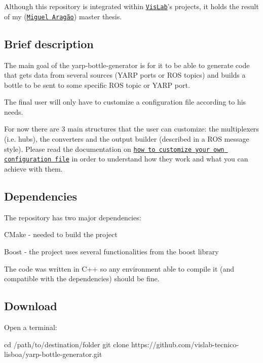 Although this repository is integrated within \href{https://github.com/vislab-tecnico-lisboa}{\tt Vis\-Lab}'s projects, it holds the result of my (\href{https://github.com/mikearagao}{\tt Miguel Aragão}) master thesis.

\subsection*{Brief description}

The main goal of the yarp-\/bottle-\/generator is for it to be able to generate code that gets data from several sources (Y\-A\-R\-P ports or R\-O\-S topics) and builds a bottle to be sent to some specific R\-O\-S topic or Y\-A\-R\-P port.

The final user will only have to customize a configuration file according to his needs.

For now there are 3 main structures that the user can customize\-: the multiplexers (i.\-e. hubs), the converters and the output builder (described in a R\-O\-S message style). Please read the documentation on \href{https://github.com/vislab-tecnico-lisboa/yarp-bottle-generator#configure-your-own-configuration-file}{\tt how to customize your own configuration file} in order to understand how they work and what you can achieve with them.

\subsection*{Dependencies}

The repository has two major dependencies\-:
\begin{DoxyItemize}
\item C\-Make -\/ needed to build the project
\item Boost -\/ the project uses several functionalities from the boost library
\end{DoxyItemize}

The code was written in C++ so any environment able to compile it (and compatible with the dependencies) should be fine.

\subsection*{Download}

Open a terminal\-: \begin{DoxyVerb}cd /path/to/destination/folder
git clone https://github.com/vislab-tecnico-lisboa/yarp-bottle-generator.git
\end{DoxyVerb}


